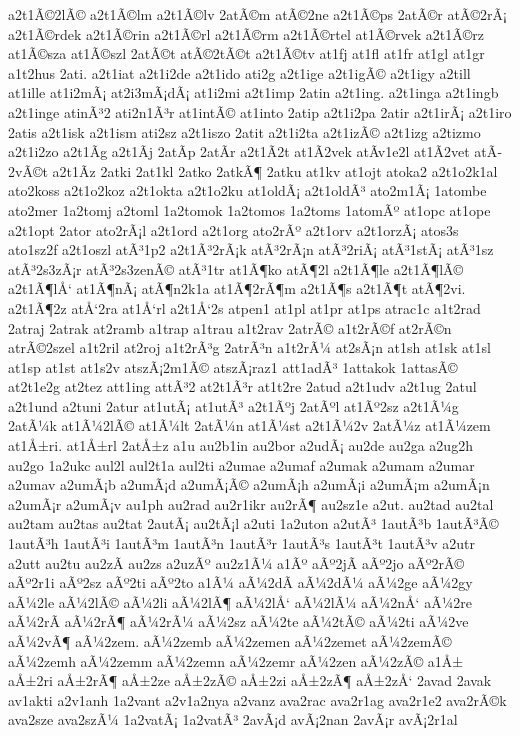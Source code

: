 {a2t1Ã©2lÃ©
a2t1Ã©lm
a2t1Ã©lv
2atÃ©m
atÃ©2ne
a2t1Ã©ps
2atÃ©r
atÃ©2rÃ¡
a2t1Ã©rdek
a2t1Ã©rin
a2t1Ã©rl
a2t1Ã©rm
a2t1Ã©rtel
at1Ã©rvek
a2t1Ã©rz
at1Ã©sza
at1Ã©szl
2atÃ©t
atÃ©2tÃ©t
a2t1Ã©tv
at1fj
at1fl
at1fr
at1gl
at1gr
a1t2hus
2ati.
a2t1iat
a2t1i2de
a2t1ido
ati2g
a2t1ige
a2t1igÃ©
a2t1igy
a2till
at1ille
at1i2mÃ¡
at2i3mÃ¡dÃ¡
at1i2mi
a2t1imp
2atin
a2t1ing.
a2t1inga
a2t1ingb
a2t1inge
atinÃ³2
ati2n1Ã³r
at1intÃ©
at1into
2atip
a2t1i2pa
2atir
a2t1irÃ¡
a2t1iro
2atis
a2t1isk
a2t1ism
ati2sz
a2t1iszo
2atit
a2t1i2ta
a2t1izÃ©
a2t1izg
a2tizmo
a2t1i2zo
a2t1Ã­g
a2t1Ã­j
2atÃ­p
2atÃ­r
a2t1Ã­2t
at1Ã­2vek
atÃ­v1e2l
at1Ã­2vet
atÃ­2vÃ©t
a2t1Ã­z
2atki
2at1kl
2atko
2atkÃ¶
2atku
at1kv
at1ojt
atoka2
a2t1o2k1al
ato2koss
a2t1o2koz
a2t1okta
a2t1o2ku
at1oldÃ¡
a2t1oldÃ³
ato2m1Ã¡
1atombe
ato2mer
1a2tomj
a2toml
1a2tomok
1a2tomos
1a2toms
1atomÃº
at1opc
at1ope
a2t1opt
2ator
ato2rÃ¡l
a2t1ord
a2t1org
ato2rÃº
a2t1orv
a2t1orzÃ¡
atos3s
ato1sz2f
a2t1oszl
atÃ³1p2
a2t1Ã³2rÃ¡k
atÃ³2rÃ¡n
atÃ³2riÃ¡
atÃ³1stÃ¡
atÃ³1sz
atÃ³2s3zÃ¡r
atÃ³2s3zenÃ©
atÃ³1tr
at1Ã¶ko
atÃ¶2l
a2t1Ã¶le
a2t1Ã¶lÃ©
a2t1Ã¶lÅ‘
at1Ã¶nÃ¡
atÃ¶n2k1a
at1Ã¶2rÃ¶m
a2t1Ã¶s
a2t1Ã¶t
atÃ¶2vi.
a2t1Ã¶2z
atÅ‘2ra
at1Å‘rl
a2t1Å‘2s
atpen1
at1pl
at1pr
at1ps
atrac1c
a1t2rad
2atraj
2atrak
at2ramb
a1trap
a1trau
a1t2rav
2atrÃ©
a1t2rÃ©f
at2rÃ©n
atrÃ©2szel
a1t2ril
at2roj
a1t2rÃ³g
2atrÃ³n
a1t2rÃ¼
at2sÃ¡n
at1sh
at1sk
at1sl
at1sp
at1st
at1s2v
atszÃ¡2m1Ã©
atszÃ¡raz1
att1adÃ³
1attakok
1attasÃ©
at2t1e2g
at2tez
att1ing
attÃ³2
at2t1Ã³r
at1t2re
2atud
a2t1udv
a2t1ug
2atul
a2t1und
a2tuni
2atur
at1utÃ¡
at1utÃ³
a2t1Ãºj
2atÃºl
at1Ãº2sz
a2t1Ã¼g
2atÃ¼k
at1Ã¼2lÃ©
at1Ã¼lt
2atÃ¼n
at1Ã¼st
a2t1Ã¼2v
2atÃ¼z
at1Ã¼zem
at1Å±ri.
at1Å±rl
2atÅ±z
a1u
au2b1in
au2bor
a2udÃ¡
au2de
au2ga
a2ug2h
au2go
1a2ukc
aul2l
aul2t1a
aul2ti
a2umae
a2umaf
a2umak
a2umam
a2umar
a2umav
a2umÃ¡b
a2umÃ¡d
a2umÃ¡Ã©
a2umÃ¡h
a2umÃ¡i
a2umÃ¡m
a2umÃ¡n
a2umÃ¡r
a2umÃ¡v
au1ph
au2rad
au2r1ikr
au2rÃ¶
au2sz1e
a2ut.
au2tad
au2tal
au2tam
au2tas
au2tat
2autÃ¡
au2tÃ¡l
a2uti
1a2uton
a2utÃ³
1autÃ³b
1autÃ³Ã©
1autÃ³h
1autÃ³i
1autÃ³m
1autÃ³n
1autÃ³r
1autÃ³s
1autÃ³t
1autÃ³v
a2utr
a2utt
au2tu
au2zÃ­
au2zs
a2uzÃº
au2z1Ã¼
a1Ãº
aÃº2jÃ­
aÃº2jo
aÃº2rÃ©
aÃº2r1i
aÃº2sz
aÃº2ti
aÃº2to
a1Ã¼
aÃ¼2dÃ­
aÃ¼2dÃ¼
aÃ¼2ge
aÃ¼2gy
aÃ¼2le
aÃ¼2lÃ©
aÃ¼2li
aÃ¼2lÃ¶
aÃ¼2lÅ‘
aÃ¼2lÃ¼
aÃ¼2nÅ‘
aÃ¼2re
aÃ¼2rÃ­
aÃ¼2rÃ¶
aÃ¼2rÃ¼
aÃ¼2sz
aÃ¼2te
aÃ¼2tÃ©
aÃ¼2ti
aÃ¼2ve
aÃ¼2vÃ¶
aÃ¼2zem.
aÃ¼2zemb
aÃ¼2zemen
aÃ¼2zemet
aÃ¼2zemÃ©
aÃ¼2zemh
aÃ¼2zemm
aÃ¼2zemn
aÃ¼2zemr
aÃ¼2zen
aÃ¼2zÃ©
a1Å±
aÅ±2ri
aÅ±2rÃ¶
aÅ±2ze
aÅ±2zÃ©
aÅ±2zi
aÅ±2zÃ¶
aÅ±2zÅ‘
2avad
2avak
av1akti
a2v1anh
1a2vant
a2v1a2nya
a2vanz
ava2rac
ava2r1ag
ava2r1e2
ava2rÃ©k
ava2sze
ava2szÃ¼
1a2vatÃ¡
1a2vatÃ³
2avÃ¡d
avÃ¡2nan
2avÃ¡r
avÃ¡2r1al
}
